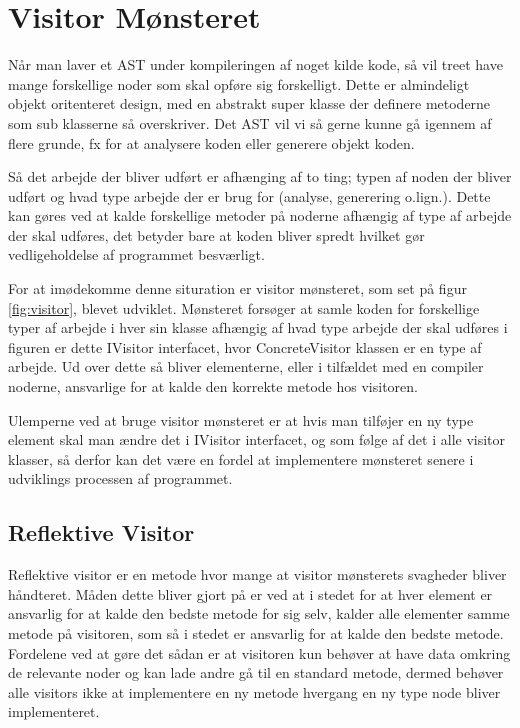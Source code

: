 \section{Visitor Mønsteret}\label{sec:visitor}


Når man laver et AST under kompileringen af noget kilde kode, så vil treet have mange forskellige noder som skal opføre sig forskelligt. Dette er almindeligt objekt oritenteret design, med en abstrakt super klasse der definere metoderne som sub klasserne så overskriver. Det AST vil vi så gerne kunne gå igennem af flere grunde, fx for at analysere koden eller generere objekt koden. 

Så det arbejde der bliver udført er afhænging af to ting; typen af noden der bliver udført og hvad type arbejde der er brug for (analyse, generering o.lign.). Dette kan gøres ved at kalde forskellige metoder på noderne afhængig af type af arbejde der skal udføres, det betyder bare at koden bliver spredt hvilket gør vedligeholdelse af programmet besværligt.


\noindent For at imødekomme denne situration er visitor mønsteret, som set på figur \ref{fig:visitor}, blevet udviklet. Mønsteret forsøger at samle koden for forskellige typer af arbejde i hver sin klasse afhængig af hvad type arbejde der skal udføres i figuren er dette IVisitor interfacet, hvor ConcreteVisitor klassen er en type af arbejde. Ud over dette så bliver elementerne, eller i tilfældet med en compiler noderne, ansvarlige for at kalde den korrekte metode hos visitoren.

Ulemperne ved at bruge visitor mønsteret er at hvis man tilføjer en ny type element skal man ændre det i IVisitor interfacet, og som følge af det i alle visitor klasser, så derfor kan det være en fordel at implementere mønsteret senere i udviklings processen af programmet.

\subsection{Reflektive Visitor}\label{ssec:refvisitor}

Reflektive visitor er en metode hvor mange at visitor mønsterets svagheder bliver håndteret. Måden dette bliver gjort på er ved at i stedet for at hver element er ansvarlig for at kalde den bedste metode for sig selv, kalder alle elementer samme metode på visitoren, som så i stedet er ansvarlig for at kalde den bedste metode. Fordelene ved at gøre det sådan er at visitoren kun behøver at have data omkring de relevante noder og kan lade andre gå til en standard metode, dermed behøver alle visitors ikke at implementere en ny metode hvergang en ny type node bliver implementeret.